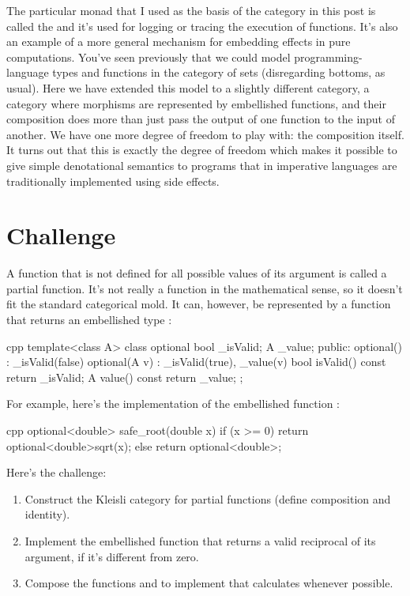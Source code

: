 The particular monad that I used as the basis of the category in this
post is called the  and it's used for logging or
tracing the execution of functions. It's also an example of a more
general mechanism for embedding effects in pure computations. You've
seen previously that we could model programming-language types and
functions in the category of sets (disregarding bottoms, as usual). Here
we have extended this model to a slightly different category, a category
where morphisms are represented by embellished functions, and their
composition does more than just pass the output of one function to the
input of another. We have one more degree of freedom to play with: the
composition itself. It turns out that this is exactly the degree of
freedom which makes it possible to give simple denotational semantics to
programs that in imperative languages are traditionally implemented
using side effects.

\section{Challenge}

A function that is not defined for all possible values of its argument
is called a partial function. It's not really a function in the
mathematical sense, so it doesn't fit the standard categorical mold. It
can, however, be represented by a function that returns an embellished
type :

\begin{snip}{cpp}
template<class A> class optional {
    bool _isValid;
    A _value;
public: 
    optional()    : _isValid(false) {}
    optional(A v) : _isValid(true), _value(v) {}
    bool isValid() const { return _isValid; }
    A value() const { return _value; }
};
\end{snip}
For example, here's the implementation of the embellished function
:

\begin{snip}{cpp}
optional<double> safe_root(double x) {
    if (x >= 0) return optional<double>{sqrt(x)}; 
    else return optional<double>{};
}
\end{snip}
Here's the challenge:

\begin{enumerate}
\tightlist
\item
  Construct the Kleisli category for partial functions (define
  composition and identity).
\item
  Implement the embellished function  that
  returns a valid reciprocal of its argument, if it's different from
  zero.
\item
  Compose the functions  and  to implement
   that calculates 
  whenever possible.
\end{enumerate}
